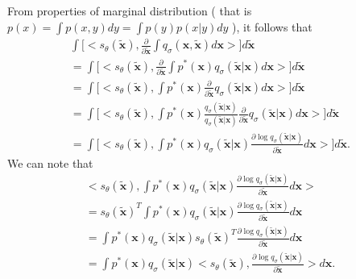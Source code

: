 \documentclass[10pt]{article}
\begin{document}
From properties of marginal distribution ( that is 
$ p(x) = \int p(x,y) dy = \int p(y) p(x|y) dy$ ), it follows that 
\begin{gather}
\int  \Big[ < s_{\theta}(\tilde{\textbf{x}}), 
    \frac{\partial} {\partial \tilde{\textbf{x}}} 
    \int   q_{\sigma}(\textbf{x}, \tilde{\textbf{x}}) d\textbf{x} >  \Big] d\tilde{\textbf{x}} \\
    = \int  \Big[ < s_{\theta}(\tilde{\textbf{x}}), 
    \frac{\partial} {\partial \tilde{\textbf{x}}} 
    \int  p^*(\textbf{x} ) q_{\sigma}(\tilde{\textbf{x}} | \textbf{x}) d\textbf{x} >  \Big] d\tilde{\textbf{x}} \\
    =  \int  \Big[ < s_{\theta}(\tilde{\textbf{x}}), 
    \int p^*(\textbf{x} )  \frac{\partial} {\partial \tilde{\textbf{x}}} q_{\sigma}(\tilde{\textbf{x}} | \textbf{x}) d\textbf{x} >  \Big] d\tilde{\textbf{x}} \\
     =  \int  \Big[ < s_{\theta}(\tilde{\textbf{x}}), 
    \int p^*(\textbf{x} )  
    \frac{ q_{\sigma}(\tilde{\textbf{x}} | \textbf{x})}{ q_{\sigma}(\tilde{\textbf{x}} | \textbf{x})}  \frac{\partial} {\partial \tilde{\textbf{x}}}
    q_{\sigma}(\tilde{\textbf{x}} | \textbf{x}) d\textbf{x} >  \Big] d\tilde{\textbf{x}} \\
      =\label{eq:sm_der_scalar} 
      \int  \Big[ < s_{\theta}(\tilde{\textbf{x}}), 
    \int p^*(\textbf{x} )  q_{\sigma}(\tilde{\textbf{x}} | \textbf{x})  
    \frac{\partial \log q_{\sigma}(\tilde{\textbf{x}} | \textbf{x})} {\partial \tilde{\textbf{x}}}
     d\textbf{x} >  \Big] d\tilde{\textbf{x}}.
\end{gather}
We can note that
\begin{gather}
< s_{\theta}(\tilde{\textbf{x}}), 
    \int p^*(\textbf{x} )  q_{\sigma}(\tilde{\textbf{x}} | \textbf{x})  
    \frac{\partial \log q_{\sigma}(\tilde{\textbf{x}} | \textbf{x})} {\partial \tilde{\textbf{x}}}
     d\textbf{x} >  \\
     =    s_{\theta}(\tilde{\textbf{x}}) ^T \int  p^*(\textbf{x} )  q_{\sigma}(\tilde{\textbf{x}} | \textbf{x})  
    \frac{\partial \log q_{\sigma}(\tilde{\textbf{x}} | \textbf{x})} {\partial \tilde{\textbf{x}}}
     d\textbf{x} \\ 
     =  \int p^*(\textbf{x} )  q_{\sigma}(\tilde{\textbf{x}} | \textbf{x})  
    s_{\theta}(\tilde{\textbf{x}}) ^T  \frac{\partial \log q_{\sigma}(\tilde{\textbf{x}} | \textbf{x})}  {\partial \tilde{\textbf{x}}} d\textbf{x} \\
     = \label{eq:prod_form}
     \int p^*(\textbf{x} )  q_{\sigma}(\tilde{\textbf{x}} | \textbf{x})  
    < s_{\theta}(\tilde{\textbf{x}}),  \frac{\partial \log q_{\sigma}(\tilde{\textbf{x}} | \textbf{x})}  {\partial \tilde{\textbf{x}}} >d\textbf{x}. 
\end{gather}
\end{document}
